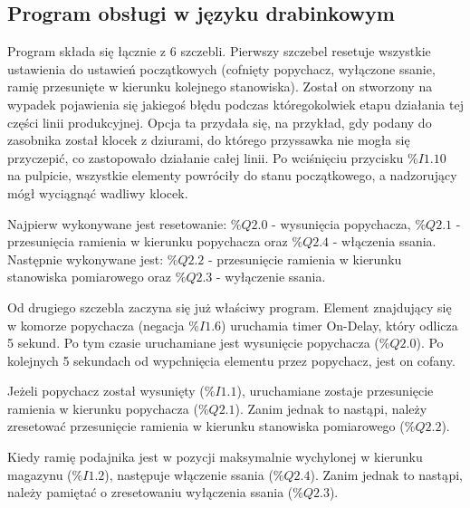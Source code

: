 \documentclass[12pt]{article}
\begin{document}
\subsection{Program obsługi w języku drabinkowym}
Program składa się łącznie z 6 szczebli. Pierwszy szczebel resetuje wszystkie ustawienia do ustawień początkowych (cofnięty popychacz, wyłączone ssanie, ramię przesunięte w kierunku kolejnego stanowiska). Został on stworzony na wypadek pojawienia się jakiegoś błędu podczas któregokolwiek etapu działania tej części linii produkcyjnej. Opcja ta przydała się, na przykład, gdy podany do zasobnika został klocek z dziurami, do którego przyssawka nie mogła się przyczepić, co zastopowało działanie całej linii. Po wciśnięciu przycisku $\%I1.10$ na pulpicie, wszystkie elementy powróciły do stanu początkowego, a nadzorujący mógł wyciągnąć wadliwy klocek.


Najpierw wykonywane jest resetowanie: $\%Q2.0$ - wysunięcia popychacza, $\%Q2.1$ - przesunięcia ramienia w kierunku popychacza oraz $\%Q2.4$ - włączenia ssania. Następnie wykonywane jest: $\%Q2.2$ - przesunięcie ramienia w kierunku stanowiska pomiarowego oraz $\%Q2.3$ - wyłączenie ssania.

Od drugiego szczebla zaczyna się już właściwy program. Element znajdujący się w komorze popychacza (negacja $\%I1.6$) uruchamia timer On-Delay, który odlicza 5 sekund. Po tym czasie uruchamiane jest wysunięcie popychacza ($\%Q2.0$). Po kolejnych 5 sekundach od wypchnięcia elementu przez popychacz, jest on cofany.


Jeżeli popychacz został wysunięty ($\%I1.1$), uruchamiane zostaje przesunięcie ramienia w kierunku popychacza ($\%Q2.1$). Zanim jednak to nastąpi, należy zresetować przesunięcie ramienia w kierunku stanowiska pomiarowego ($\%Q2.2$).


Kiedy ramię podajnika jest w pozycji maksymalnie wychylonej w kierunku magazynu ($\%I1.2$), następuje włączenie ssania ($\%Q2.4$). Zanim jednak to nastąpi, należy pamiętać o zresetowaniu wyłączenia ssania ($\%Q2.3$).

\end{document}
